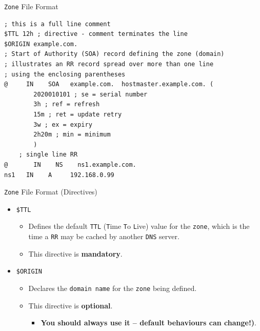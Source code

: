 \documentclass[xcolor=table]{beamer}
\begin{document}
\begin{frame}[fragile]{\texttt{Zone} File Format}
  \lstset{
    basicstyle=\scriptsize\ttfamily,
  }
  \begin{lstlisting}
; this is a full line comment
$TTL 12h ; directive - comment terminates the line
$ORIGIN example.com.
; Start of Authority (SOA) record defining the zone (domain)
; illustrates an RR record spread over more than one line
; using the enclosing parentheses
@     IN    SOA   example.com.  hostmaster.example.com. (
        2020010101 ; se = serial number
        3h ; ref = refresh
        15m ; ret = update retry
        3w ; ex = expiry
        2h20m ; min = minimum
        )
    ; single line RR
@	    IN    NS    ns1.example.com.
ns1   IN    A     192.168.0.99
  \end{lstlisting}
\end{frame}

\begin{frame}{\texttt{Zone} File Format (Directives)}
  \begin{itemize}
    \item \texttt{\$TTL}
      \begin{itemize}
        \item Defines the default \texttt{TTL} (\texttt{T}ime \texttt{T}o \texttt{L}ive) value for the \texttt{zone}, which is the time a \texttt{RR} may be cached by another \texttt{DNS} server.
        \item This directive is \textbf{mandatory}.
      \end{itemize}
      \item \texttt{\$ORIGIN}
      \begin{itemize}
        \item Declares the \texttt{domain name} for the \texttt{zone} being defined.
        \item This directive is \textbf{optional}.
        \begin{itemize} 
          \item \textbf{You should always use it – default behaviours can change!)}.
        \end{itemize}
      \end{itemize}
  \end{itemize}
\end{frame}
\end{document}
